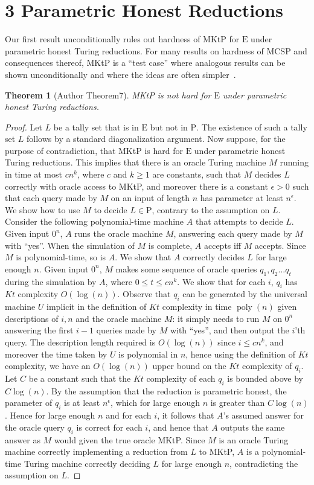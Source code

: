 \documentclass[10pt,a4paper]{article}
\newtheorem{nttheorem}{Theorem}
\newcommand{\poly}{\operatorname{poly}}
\begin{document}
\section*{3 Parametric Honest Reductions}
Our first result unconditionally rules out hardness of MKtP for $\mathrm E$ under parametric honest Turing reductions. For many results on hardness of MCSP and consequences thereof, MKtP is a ``test case'' where analogous results can be shown unconditionally and where the ideas are often simpler~\cite{ref8,ref16}.
\begin{nttheorem}[Author Theorem7]
MKtP is not hard for $\mathrm E$ under parametric honest Turing reductions.
\end{nttheorem}
\begin{proof}
Let $L$ be a tally set that is in $\mathrm E$ but not in $\mathrm P$. The existence of such a tally set $L$ follows by a standard diagonalization argument.
Now suppose, for the purpose of contradiction, that MKtP is hard for $\mathrm E$ under parametric honest Turing reductions. This implies that there is an oracle Turing machine $M$ running in time at most $cn^k$, where $c$ and $k\geq1$ are constants, such that $M$ decides $L$ correctly with oracle access to MKtP, and moreover there is a constant $\epsilon>0$ such that each query made by $M$ on an input of length $n$ has parameter at least $n^\epsilon$. We show how to use $M$ to decide $L\in\mathrm P$, contrary to the assumption on $L$.
Consider the following polynomial-time machine $A$ that attempts to decide $L$. Given input $0^n$, $A$ runs the oracle machine $M$, answering each query made by $M$ with ``yes''. When the simulation of $M$ is complete, $A$ accepts iff $M$ accepts. Since $M$ is polynomial-time, so is $A$. We show that $A$ correctly decides $L$ for large enough $n$.
Given input $0^n$, $M$ makes some sequence of oracle queries $q_1,q_2\ldots q_t$ during the simulation by $A$, where $0\leq t\leq cn^k$. We show that for each $i$, $q_i$ has $Kt$ complexity $O(\log(n))$. Observe that $q_i$ can be generated by the universal machine $U$ implicit in the definition of $Kt$ complexity in time $\poly(n)$ given descriptions of $i,n$ and the oracle machine $M$: it simply needs to run $M$ on $0^n$ answering the first $i-1$ queries made by $M$ with ``yes'', and then output the $i$'th query. The description length required is $O(\log(n))$ since $i\leq cn^k$, and moreover the time taken by $U$ is polynomial in $n$, hence using the definition of $Kt$ complexity, we have an $O(\log(n))$ upper bound on the $Kt$ complexity of $q_i$. Let $C$ be a constant such that the $Kt$ complexity of each $q_i$ is bounded above by $C\log(n)$.
By the assumption that the reduction is parametric honest, the parameter of $q_i$ is at least $n^\epsilon$, which for large enough $n$ is greater than $C\log(n)$. Hence for large enough $n$ and for each $i$, it follows that $A$'s assumed answer for the oracle query $q_i$ is correct for each $i$, and hence that $A$ outputs the same answer as $M$ would given the true oracle MKtP. Since $M$ is an oracle Turing machine correctly implementing a reduction from $L$ to MKtP, $A$ is a polynomial-time Turing machine correctly deciding $L$ for large enough $n$, contradicting the assumption on $L$.
\end{proof}
\end{document}

